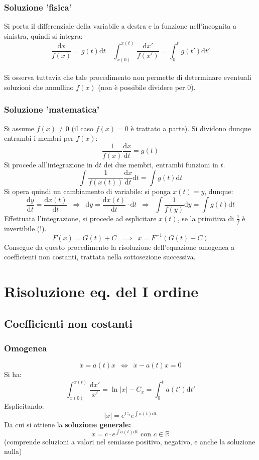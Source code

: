 \documentclass[10pt, oneside]{book}
\theoremstyle{plain}
\begin{document}
\subsubsection*{Soluzione 'fisica'}
Si porta il differenziale della variabile a destra e la funzione nell'incognita a sinistra, quindi si integra:
\[\frac{\textrm{d}x}{f(x)} = g(t) \textrm{d}t \quad \int_{x(0)}^{x(t)}\frac{\textrm{d}x'}{f(x')} = \int_0^t g(t') \textrm{d}t'\]
\\Si osserva tuttavia che tale procedimento non permette di determinare eventuali soluzioni che annullino $f(x)$ (non è possibile dividere per $0$).

\subsubsection*{Soluzione 'matematica'}
Si assume $f(x) \neq 0$ (il caso $f(x) = 0$ è trattato a parte). Si dividono dunque entrambi i membri per $f(x)$:
\[\frac{1}{f(x)}\frac{\textrm{d}x}{\textrm{d}t} = g(t)\]
Si procede all'integrazione in $\textrm{d}t$ dei due membri, entrambi funzioni in $t$.
\[\int \frac{1}{f(x(t))}\frac{\textrm{d}x}{\textrm{d}t} \textrm{d}t = \int g(t) \textrm{d}t\]
Si opera quindi un cambiamento di variabile: si ponga $x(t) = y$, dunque:
\[\frac{\textrm{d}y}{\textrm{d}t} = \frac{\textrm{d}x(t)}{\textrm{d}t} \enspace \Rightarrow \enspace \textrm{d}y = \frac{\textrm{d}x(t)}{\textrm{d}t} \cdot \textrm{d}t \enspace \Rightarrow \enspace \int \frac{1}{f(y)}\textrm{d}y  = \int g(t) \textrm{d}t\]
Effettuata l'integrazione, si procede ad esplicitare $x(t)$, se la primitiva di $\frac{1}{f}$ è invertibile (!).
\[F(x) = G(t) + C \enspace \implies \enspace x = F^{-1}(G(t) + C)\]
Consegue da questo procedimento la risoluzione dell'equazione omogenea a coefficienti non costanti, trattata nella sottosezione successiva.

\section{Risoluzione eq. del I ordine}
\subsection{Coefficienti non costanti}
\subsubsection*{Omogenea}
\[\dot x = a(t) x \enspace \Leftrightarrow \enspace \dot x - a(t) x = 0\]
Si ha:
\[\int_{x(0)}^{x(t)} \frac{\textrm{d}x'}{x'} = \ln|x| - C_x = \int_0^t a(t') \textrm{d}t'\]
Esplicitando:
\[|x| = e^{C_x}e^{\int a(t) \textrm{d}t}\]
Da cui si ottiene la \textbf{soluzione generale:}
\[\boxed{x = c \cdot e^{\int a(t) \textrm{d}t}} \textrm{ con } c \in \mathbb{R}\]
(comprende soluzioni a valori nel semiasse positivo, negativo, e anche la soluzione nulla)
\end{document}
